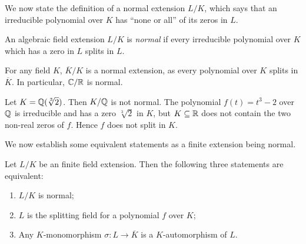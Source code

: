 We now state the definition of a normal extension $L/K$, which says that an irreducible polynomial over $K$ has ``none or all'' of its zeros in $L$. 

\begin{definition}
    An algebraic field extension $L/ K$ is \textit{normal} if every irreducible polynomial over $K$ which has a zero in $L$ splits in $L$. 
\end{definition}

\begin{example}
	For any field $K$, $\overline K / K$ is a normal extension, as every polynomial over $K$ splits in $\overline K$. In particular, $\mathbb C / \mathbb R$ is normal. 
\end{example}


\begin{example}
    Let $K = \mathbb Q(\sqrt[3]{2})$. Then $K / \mathbb Q$ is not normal. The polynomial $f(t) = t^3 - 2$ over $\mathbb Q$ is irreducible and has a zero $\sqrt[3]{2}$ in $K$, but $K \subseteq \mathbb R$ does not contain the two non-real zeros of $f$. Hence $f$ does not split in $K$.
\end{example}

We now establish some equivalent statements as a finite extension being normal.

\begin{theorem} \label{thm:normal-equiv-def}
    Let $L/K$ be an finite field extension. Then the following three statements are equivalent:
    \begin{enumerate}[label=(\roman*)]
        \item $L/K$ is normal;
        \item $L$ is the splitting field for a polynomial $f$ over $K$;
        \item Any $K$-monomorphism $\sigma: L \to \overline K$ is a $K$-automorphism of $L$. 
    \end{enumerate}
\end{theorem}

